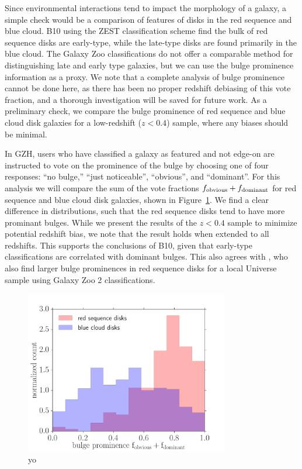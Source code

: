 \documentclass[useAMS,usenatbib]{mn2e}
\begin{document}
Since environmental interactions tend to impact the morphology of a galaxy, a simple check would be a comparison of features of disks in the red sequence and blue cloud. B10 using the ZEST classification scheme find the bulk of red sequence disks are early-type, while the late-type disks are found primarily in the blue cloud. The Galaxy Zoo classifications do not offer a comparable method for distinguishing late and early type galaxies, but we can use the bulge prominence information as a proxy. We note that a complete analysis of bulge prominence cannot be done here, as there has been no proper redshift debiasing of this vote fraction, and a thorough investigation will be saved for future work. As a preliminary check, we compare the bulge prominence of red sequence and blue cloud disk galaxies for a low-redshift ($z<0.4$) sample, where any biases should be minimal. 

In GZH, users who have classified a galaxy as featured and not edge-on are instructed to vote on the prominence of the bulge by choosing one of four responses: ``no bulge,'' ``just noticeable'', ``obvious'', and ``dominant''. For this analysis we will compare the sum of the vote fractions $f_{\rm obvious} + f_{\rm dominant}$ for red sequence and blue cloud disk galaxies, shown in Figure~\ref{fig:bulge}. We find a clear difference in distributions, such that the red sequence disks tend to have more prominant bulges. While we present the results of the $z<0.4$ sample to minimize potential redshift bias, we note that the result holds when extended to all redshifts. This supports the conclusions of B10, given that early-type classifications are correlated with dominant bulges. This also agrees with \citet{Masters2010}, who also find larger bulge prominences in red sequence disks for a local Universe sample using Galaxy Zoo 2 classifications. 

\begin{figure}
\centering
\includegraphics[width=3.5in]{figures/bulge_comparison.pdf}
\caption{yo}
\label{fig:bulge}
\end{figure}
  
\end{document}
